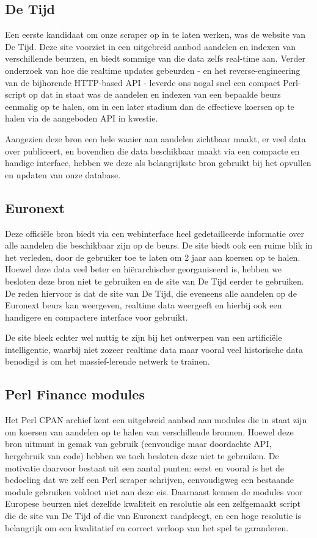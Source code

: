 \subsection{De Tijd}

Een eerste kandidaat om onze scraper op in te laten werken, was de website van De Tijd. Deze site voorziet in een uitgebreid aanbod aandelen en indexen van verschillende beurzen, en biedt sommige van die data zelfs real-time aan. Verder onderzoek van hoe die realtime updates gebeurden - en het reverse-engineering van de bijhorende HTTP-based API - leverde ons nogal snel een compact Perl-script op dat in staat was de aandelen en indexen van een bepaalde beurs eenmalig op te halen, om in een later stadium dan de effectieve koersen op te halen via de aangeboden API in kwestie.

Aangezien deze bron een hele waaier aan aandelen zichtbaar maakt, er veel data over publiceert, en bovendien die data beschikbaar maakt via een compacte en handige interface, hebben we deze als belangrijkste bron gebruikt bij het opvullen en updaten van onze database.

\subsection{Euronext}

Deze offici\"ele bron biedt via een webinterface heel gedetailleerde informatie over alle aandelen die beschikbaar zijn op de beurs. De site biedt ook een ruime blik in het verleden, door de gebruiker toe te laten om 2 jaar aan koersen op te halen. Hoewel deze data veel beter en hi\"erarchischer georganiseerd is, hebben we besloten deze bron niet te gebruiken en de site van De Tijd eerder te gebruiken. De reden hiervoor is dat de site van De Tijd, die eveneens alle aandelen op de Euronext beurs kan weergeven, realtime data weergeeft en hierbij ook een handigere en compactere interface voor gebruikt.

De site bleek echter wel nuttig te zijn bij het ontwerpen van een artifici\"ele intelligentie, waarbij niet zozeer realtime data maar vooral veel historische data benodigd is om het massief-lerende netwerk te trainen.

\subsection{Perl Finance modules}

Het Perl CPAN archief kent een uitgebreid aanbod aan modules die in staat zijn om koersen van aandelen op te halen van verschillende bronnen. Hoewel deze bron uitmunt in gemak van gebruik (eenvoudige maar doordachte API, hergebruik van code) hebben we toch besloten deze niet te gebruiken. De motivatie daarvoor bestaat uit een aantal punten: eerst en vooral is het de bedoeling dat we zelf een Perl scraper schrijven, eenvoudigweg een bestaande module gebruiken voldoet niet aan deze eis. Daarnaast kennen de modules voor Europese beurzen niet dezelfde kwaliteit en resolutie als een zelfgemaakt script die de site van De Tijd of die van Euronext raadpleegt, en een hoge resolutie is belangrijk om een kwalitatief en correct verloop van het spel te garanderen.

